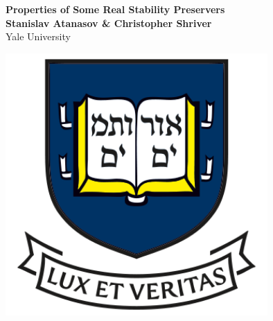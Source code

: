 \documentclass[a0,landscape]{a0poster}
\begin{document}


\begin{minipage}[b]{0.55\linewidth}
\veryHuge \color{NavyBlue} \textbf{Properties of Some Real Stability Preservers} \color{Black}\\ %
\huge \textbf{Stanislav Atanasov \& Christopher Shriver}\\ %
\huge Yale University\\ %
\end{minipage}
%
\begin{minipage}[b]{0.25\linewidth}
\hspace{5cm}
\end{minipage}
%
\begin{minipage}[b]{0.19\linewidth}
\includegraphics[width=10cm]{images/yale} %
\end{minipage}

\vspace{1cm} %
\end{document}
